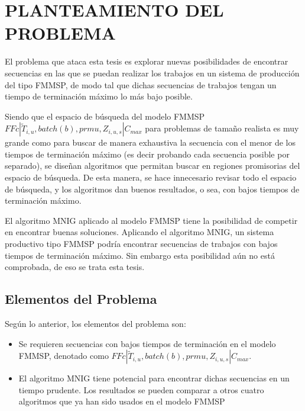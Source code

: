 \documentclass{article}
\def\notac_modelo{$FFc | \tilde{T}_{i, u}, batch(b), prmu, Z_{i, u, s} | C_{max}$}
\begin{document}
\section{PLANTEAMIENTO DEL PROBLEMA}

El problema que ataca esta tesis es explorar nuevas posibilidades de encontrar secuencias en las que se puedan realizar los trabajos en un sistema de producción del tipo FMMSP, de modo tal que dichas secuencias de trabajos tengan un tiempo de terminación máximo lo más bajo posible.

\vspace{\baselineskip}
Siendo que el espacio de búsqueda del modelo FMMSP \linebreak \notac_modelo para problemas de tamaño realista es muy grande como para buscar de manera exhaustiva la secuencia con el menor de los tiempos de terminación máximo (es decir probando cada secuencia posible por separado), se diseñan algoritmos que permitan buscar en regiones promisorias del espacio de búsqueda. De esta manera, se hace innecesario revisar todo el espacio de búsqueda, y los algoritmos dan buenos resultados, o sea, con bajos tiempos de terminación máximo.

\vspace{\baselineskip}
El algoritmo MNIG aplicado al modelo FMMSP tiene la posibilidad de competir en encontrar buenas soluciones. Aplicando el algoritmo MNIG, un sistema productivo tipo FMMSP podría encontrar secuencias de trabajos con bajos tiempos de terminación máximo. Sin embargo esta posibilidad aún no está comprobada, de eso se trata esta tesis.

\subsection{Elementos del Problema}

Según lo anterior, los elementos del problema son:

\vspace{\baselineskip}
\begin{itemize}
    \item[\maltese] Se requieren secuencias con bajos tiempos de terminación en el modelo FMMSP, denotado como \notac_modelo.
    \item[\maltese] El algoritmo MNIG tiene potencial para encontrar dichas secuencias en un tiempo prudente. Los resultados se pueden comparar a otros cuatro algoritmos que ya han sido usados en el modelo FMMSP
\end{itemize}
\end{document}
